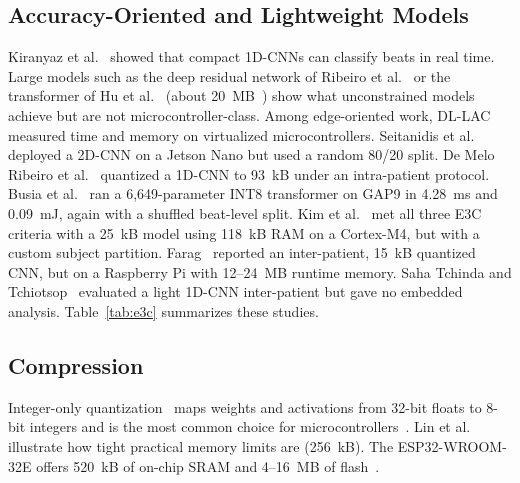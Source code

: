 \documentclass[conference]{IEEEtran}
\begin{document}
\subsection{Accuracy-Oriented and Lightweight Models}
Kiranyaz et al.~\cite{kiranyaz2016realtime} showed that compact 1D-CNNs can classify beats in real time. Large models such as the deep residual network of Ribeiro et al.~\cite{ribeiro2020automatic} or the transformer of Hu et al.~\cite{hu2022transformer} (about 20~MB~\cite{busia2025tiny}) show what unconstrained models achieve but are not microcontroller-class. Among edge-oriented work, DL-LAC~\cite{sakib2021ultraedge} measured time and memory on virtualized microcontrollers. Seitanidis et al.~\cite{seitanidis2022edge} deployed a 2D-CNN on a Jetson Nano but used a random 80/20 split. De Melo Ribeiro et al.~\cite{demeloribeiro2022quantized} quantized a 1D-CNN to 93~kB under an intra-patient protocol. Busia et al.~\cite{busia2025tiny} ran a 6,649-parameter INT8 transformer on GAP9 in 4.28~ms and 0.09~mJ, again with a shuffled beat-level split. Kim et al.~\cite{kim2024ultraedge} met all three E3C criteria with a 25~kB model using 118~kB RAM on a Cortex-M4, but with a custom subject partition. Farag~\cite{farag2023tiny} reported an inter-patient, 15~kB quantized CNN, but on a Raspberry Pi with 12--24~MB runtime memory. Saha Tchinda and Tchiotsop~\cite{sahatchinda2025lightweight} evaluated a light 1D-CNN inter-patient but gave no embedded analysis. Table~\ref{tab:e3c} summarizes these studies.

\subsection{Compression}
Integer-only quantization~\cite{jacob2018quantization} maps weights and activations from 32-bit floats to 8-bit integers and is the most common choice for microcontrollers~\cite{demeloribeiro2022quantized,busia2025tiny}. Lin et al.~\cite{lin2022ondevice} illustrate how tight practical memory limits are (256~kB). The ESP32-WROOM-32E offers 520~kB of on-chip SRAM and 4--16~MB of flash~\cite{espressif2023esp32}.
\end{document}

